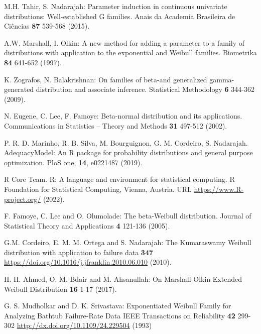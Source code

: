 \documentclass[twoside,leqno,11pt]{article}
\begin{document}
\begin{thebibliography}{8}

\item
M.H. Tahir, S. Nadarajah:
Parameter induction in continuous univariate distributions: Well-established G families.
Anais da Academia Brasileira de Ci\^{e}ncias {\bf 87} 539-568 (2015).

\item
A.W. Marshall, I. Olkin:
A new method for adding a parameter to a family of distributions with
application to the exponential and Weibull families.
Biometrika {\bf 84} 641-652 (1997).

\item
K. Zografos, N. Balakrishnan:
On families of beta-and generalized gamma-generated distribution and
associate inference.  Statistical Methodology {\bf 6} 344-362 (2009).

\item
N. Eugene, C. Lee, F. Famoye:
Beta-normal distribution and its applications.
Communications in Statistics -- Theory and Methods {\bf 31} 497-512 (2002).

\item 
P. R. D. Marinho,  R. B. Silva,  M. Bourguignon, G. M. Cordeiro,  S. Nadarajah. AdequacyModel: An R package for probability distributions and general purpose optimization. PloS one, {\bf 14}, e0221487 (2019).

\item
R Core Team. R: A language and environment for statistical computing. R Foundation for Statistical Computing, Vienna, Austria. URL
\url{https://www.R-project.org/} (2022).

\item 
F. Famoye, C. Lee and O. Olumolade: The beta-Weibull distribution. Journal of Statistical Theory and Applications {\bf4} 121-136 (2005).

\item G.M. Cordeiro, E. M. M. Ortega and S. Nadarajah: The Kumaraswamy Weibull distribution with application to failure data {\bf 347} \url{https://doi.org/10.1016/j.jfranklin.2010.06.010} (2010).

\item 
H. H. Ahmed, O. M. Bdair and M. Ahsanullah: On Marshall-Olkin Extended Weibull Distribution \textbf{16} 1-17 (2017).

\item 
G. S. Mudholkar and D. K. Srivastava: Exponentiated Weibull Family for Analyzing Bathtub Failure-Rate Data IEEE Transactions on Reliability \textbf{42} 299-302 \url{http://dx.doi.org/10.1109/24.229504} (1993)


\end{thebibliography}
\end{document}
